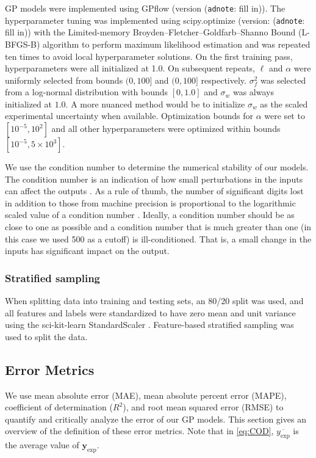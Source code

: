 \documentclass[journal=jacsat,manuscript=article]{achemso}
\newcommand{\adnote}[1]{{\color{OliveGreen} (\texttt{adnote}: #1)}}
\begin{document}
 GP models were implemented using GPflow \cite{Matthews2017GPflow:TensorFlow} (version \adnote{fill in}). The hyperparameter tuning was implemented using scipy.optimize \cite{Virtanen2020SciPyPython} (version: \adnote{fill in}) with the Limited-memory Broyden–Fletcher–Goldfarb–Shanno Bound (L-BFGS-B) algorithm to perform maximum likelihood estimation and was repeated ten times to avoid local hyperparameter solutions. On the first training pass, hyperparameters were all initialized at 1.0. On subsequent repeats, $\ell$ and $\alpha$ were uniformly selected from bounds $(0, 100]$ and $(0, 100]$ respectively. $\sigma^2_f$ was selected from a log-normal distribution with bounds $[0,1.0]$ and $\sigma_w$ was always initialized at $1.0$. A more nuanced method would be to initialize $\sigma_w$ as the scaled experimental uncertainty when available. Optimization bounds for $\alpha$ were set to $[10^{-5}, 10^2]$ and all other hyperparameters were optimized within bounds $[10^{-5}, 5\times 10^3]$.

 We use the condition number to determine the numerical stability of our models. The condition number is an indication of how small perturbations in the inputs can affect the outputs \cite{Foster2009}. As a rule of thumb, the number of significant digits lost in addition to those from machine precision is proportional to the logarithmic scaled value of a condition number \cite{NumMathComput}. Ideally, a condition number should be as close to one as possible and a condition number that is much greater than one (in this case we used 500 as a cutoff) is ill-conditioned. That is, a small change in the inputs has significant impact on the output.



\subsubsection{Stratified sampling}
When splitting data into training and testing sets, an 80/20 split was used, and all features and labels were standardized to have zero mean and unit variance using the sci-kit-learn StandardScaler \cite{scikit-learn}. Feature-based stratified sampling was used to split the data.

\subsection{Error Metrics}
We use mean absolute error (MAE), mean absolute percent error (MAPE), coefficient of determination ($R^2$), and root mean squared error (RMSE) to quantify and critically analyze the error of our GP models. This section gives an overview of the definition of these error metrics. Note that in \eqref{eq:COD}, $\overline{y_{\text{exp}}}$ is the average value of $\mathbf{y}_{\text{exp}}$. 
\end{document}
